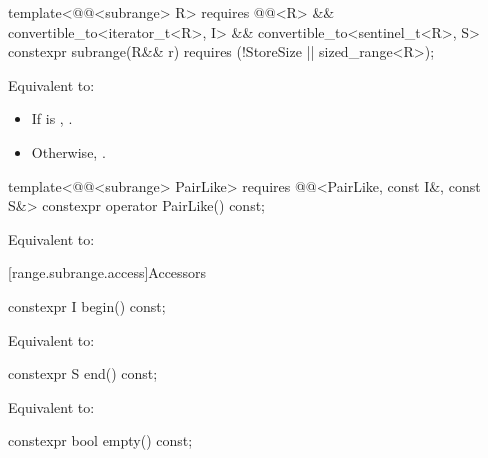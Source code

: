 %
\begin{itemdecl}
template<@@<subrange> R>
  requires @@<R> &&
           convertible_to<iterator_t<R>, I> && convertible_to<sentinel_t<R>, S>
constexpr subrange(R&& r) requires (!StoreSize || sized_range<R>);
\end{itemdecl}

\begin{itemdescr}
\pnum
\effects
Equivalent to:
\begin{itemize}
\item If  is ,
.
\item Otherwise, .
\end{itemize}
\end{itemdescr}

%
\begin{itemdecl}
template<@@<subrange> PairLike>
  requires @@<PairLike, const I&, const S&>
constexpr operator PairLike() const;
\end{itemdecl}

\begin{itemdescr}
\pnum
\effects
Equivalent to: 
\end{itemdescr}

[range.subrange.access]{Accessors}

%
\begin{itemdecl}
constexpr I begin() const;
\end{itemdecl}

\begin{itemdescr}
\pnum
\effects
Equivalent to: 
\end{itemdescr}

%
\begin{itemdecl}
constexpr S end() const;
\end{itemdecl}

\begin{itemdescr}
\pnum
\effects
Equivalent to: 
\end{itemdescr}

%
\begin{itemdecl}
constexpr bool empty() const;
\end{itemdecl}

